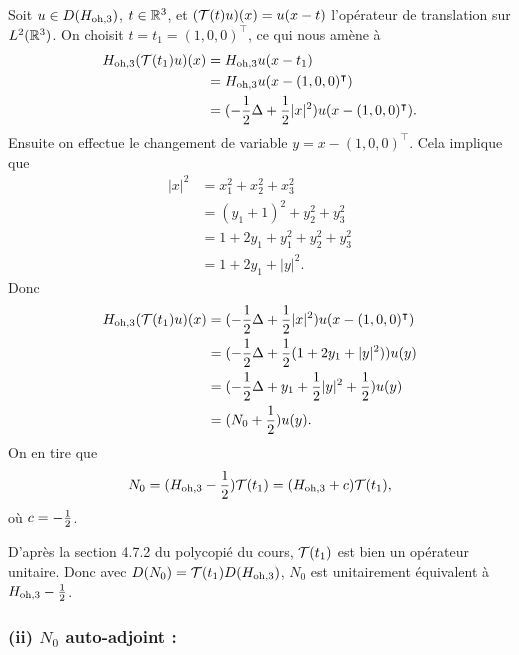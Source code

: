 Soit $u \in D(H_\text{oh,3})$, $t \in \mathbb{R}^3$, et $(\mathcal{T}(t) u)(x) = u(x - t)$
l'opérateur de translation sur $L^2(\mathbb{R}^3)$. On choisit
$t = t_1 = (1,0,0)^\intercal$, ce qui nous amène à
\begin{align}
    H_\text{oh,3} (\mathcal{T}(t_1) u)(x) &= H_\text{oh,3} u(x - t_1) \\
    &= H_\text{oh,3} u(x - (1,0,0)^\intercal) \\
    &= (-\frac{1}{2} \Delta + \frac{1}{2} |x|^2) u(x - (1,0,0)^\intercal).
\end{align}
%
Ensuite on effectue le changement de variable $y = x - (1,0,0)^\intercal$.
Cela implique que
\begin{align}
    |x|^2 &= x_1^2 + x_2^2 + x_3^2 \\
    &= (y_1 + 1)^2 + y_2^2 + y_3^2 \\
    &= 1 + 2y_1 + y_1^2 + y_2^2 + y_3^2 \\
    &= 1 + 2y_1 + |y|^2.
\end{align}
%
Donc
\begin{align}
    H_\text{oh,3} (\mathcal{T}(t_1) u)(x)
    &= (-\frac{1}{2} \Delta + \frac{1}{2} |x|^2) u(x - (1,0,0)^\intercal) \\
    &= (-\frac{1}{2} \Delta + \frac{1}{2} (1 + 2y_1 + |y|^2)) u(y) \\
    &= (-\frac{1}{2} \Delta + y_1 + \frac{1}{2} |y|^2 + \frac{1}{2} ) u(y) \\
    &= (N_0 + \frac{1}{2}) u(y).
\end{align}
%
On en tire que
\begin{align}
    N_0 = (H_\text{oh,3} - \frac{1}{2})\mathcal{T}(t_1) = (H_\text{oh,3} + c)\mathcal{T}(t_1),
\end{align}
%
où $c = - \frac{1}{2}$.

D'après la section 4.7.2 du polycopié du cours, $\mathcal{T}(t_1)$ est
bien un opérateur unitaire.
Donc avec $D(N_0) = \mathcal{T}(t_1) D(H_\text{oh,3})$, $N_0$ est unitairement équivalent
à $H_\text{oh,3} - \frac{1}{2}$.

\subsubsection*{(ii) $N_0$ auto-adjoint :}

